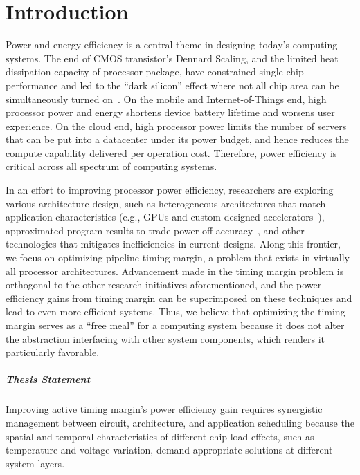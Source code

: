 
\chapter{Introduction}
\label{sec:intro}

Power and energy efficiency is a central theme in designing today's computing systems. The end of CMOS transistor's Dennard Scaling, and the limited heat dissipation capacity of processor package, have constrained single-chip performance and led to the ``dark silicon'' effect where not all chip area can be simultaneously turned on~\cite{esmaeilzadeh2011dark}. On the mobile and Internet-of-Things end, high processor power and energy shortens device battery lifetime and worsens user experience. On the cloud end, high processor power limits the number of servers that can be put into a datacenter under its power budget, and hence reduces the compute capability delivered per operation cost. Therefore, power efficiency is critical across all spectrum of computing systems. 

In an effort to improving processor power efficiency, researchers are exploring various architecture design, such as heterogeneous architectures that match application characteristics (e.g., GPUs and custom-designed accelerators~\cite{nickolls2010gpu,chen2014diannao}), approximated program results to trade power off accuracy~\cite{sampsonenerj}, and other technologies that mitigates inefficiencies in current designs. Along this frontier, we focus on optimizing pipeline timing margin, a problem that exists in virtually all processor architectures. Advancement made in the timing margin problem is orthogonal to the other research initiatives aforementioned, and the power efficiency gains from timing margin can be superimposed on these techniques and lead to even more efficient systems. Thus, we believe that optimizing the timing margin serves as a ``free meal'' for a computing system because it does not alter the abstraction interfacing with other system components, which renders it particularly favorable.

\paragraph{Thesis Statement} Improving active timing margin’s power efficiency gain requires synergistic management between circuit, architecture, and application scheduling because the spatial and temporal characteristics of different chip load effects, such as temperature and voltage variation, demand appropriate solutions at different system layers.

